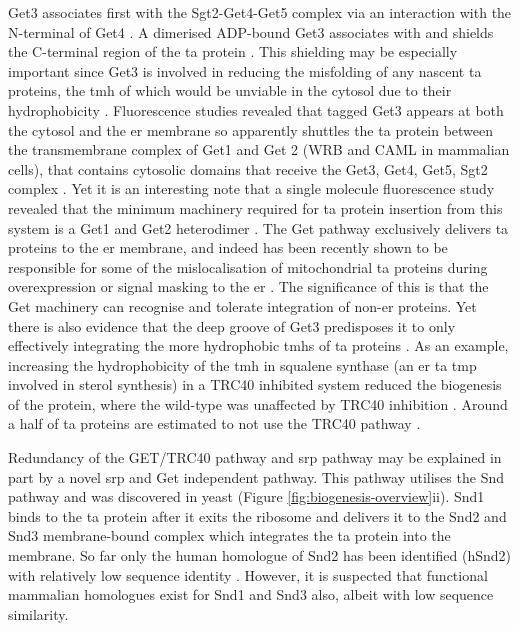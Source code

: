 Get3 associates first with the Sgt2\--Get4\--Get5 complex via an interaction with the N-terminal of Get4 \cite{Wang2010}.
A dimerised ADP-bound Get3 \cite{Mateja2009, Hu2009, Bozkurt2009, Suloway2009, Yamagata2010} associates with and shields the C\--terminal region of the \gls{ta} protein \cite{Stefanovic2007, Schuldiner2008, Favaloro2008}.
This shielding may be especially important since Get3 is involved in reducing the misfolding of any nascent \gls{ta} proteins, the \gls{tmh} of which would be unviable in the cytosol due to their hydrophobicity \cite{Jonikas2009}.
Fluorescence studies revealed that tagged Get3 appears at both the cytosol and the \gls{er} membrane so apparently shuttles the \gls{ta} protein between the transmembrane complex of Get1 and Get 2 (WRB and CAML in mammalian cells), that contains cytosolic domains that receive the Get3, Get4, Get5, Sgt2 complex \cite{Huh2003, Zalisko2017}.
Yet it is an interesting note that a single molecule fluorescence study revealed that the minimum machinery required for \gls{ta} protein insertion from this system is a Get1 and Get2 heterodimer \cite{Zalisko2017}.
The Get pathway exclusively delivers \gls{ta} proteins to the \gls{er} membrane, and indeed has been recently shown to be responsible for some of the mislocalisation of mitochondrial \gls{ta} proteins during overexpression or signal masking to the \gls{er} \cite{Vitali2018}.
The significance of this is that the Get machinery can recognise and tolerate integration of non\--\gls{er} proteins.
Yet there is also evidence that the deep groove of Get3 \cite{Mariappan2011, Stefer2011} predisposes it to only effectively integrating the more hydrophobic \gls{tmh}s of \gls{ta} proteins \cite{Wang2010, Rao2016}.
As an example, increasing the hydrophobicity of the \gls{tmh} in squalene synthase (an \gls{er} \gls{ta} \gls{tmp} involved in sterol synthesis) in a TRC40 inhibited system reduced the biogenesis of the protein, where the wild\--type was unaffected by TRC40 inhibition \cite{Guna2018a}.
Around a half of \gls{ta} proteins are estimated to not use the TRC40 pathway \cite{Guna2018a}.

Redundancy of the GET/TRC40 pathway and \gls{srp} pathway may be explained in part by a novel \gls{srp} and Get independent pathway.
This pathway utilises the Snd pathway and was discovered in yeast \cite{Aviram2016} (Figure \ref{fig:biogenesis-overview}ii).
Snd1 binds to the \gls{ta} protein after it exits the ribosome and delivers it to the Snd2 and Snd3 membrane\--bound complex which integrates the \gls{ta} protein into the membrane.
So far only the human homologue of Snd2 has been identified (hSnd2) with relatively low sequence identity \cite{Hassdenteufel2017}.
However, it is suspected that functional mammalian homologues exist for Snd1 and Snd3 also, albeit with low sequence similarity.

